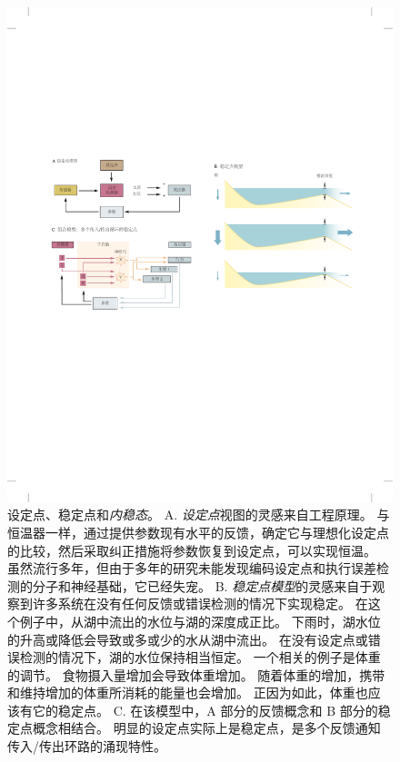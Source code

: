 \begin{figure}[htbp]
	\centering
	\includegraphics[width=1.0\linewidth]{chap41/fig_41_1}
	\caption{设定点、稳定点和\textit{内稳态}。
		A. \textit{设定点}视图的灵感来自工程原理。
		与恒温器一样，通过提供参数现有水平的反馈，确定它与理想化设定点的比较，然后采取纠正措施将参数恢复到设定点，可以实现恒温。
		虽然流行多年，但由于多年的研究未能发现编码设定点和执行误差检测的分子和神经基础，它已经失宠。
		B. \textit{稳定点模型}的灵感来自于观察到许多系统在没有任何反馈或错误检测的情况下实现稳定。
		在这个例子中，从湖中流出的水位与湖的深度成正比。
		下雨时，湖水位的升高或降低会导致或多或少的水从湖中流出。
		在没有设定点或错误检测的情况下，湖的水位保持相当恒定。
		一个相关的例子是体重的调节。
		食物摄入量增加会导致体重增加。 随着体重的增加，携带和维持增加的体重所消耗的能量也会增加。
		正因为如此，体重也应该有它的稳定点\cite{speakman2011set}。
		C. 在该模型中，A 部分的反馈概念和 B 部分的稳定点概念相结合。
		明显的设定点实际上是稳定点，是多个反馈通知传入/传出环路的涌现特性。}
	\label{fig:41_1}
\end{figure}


